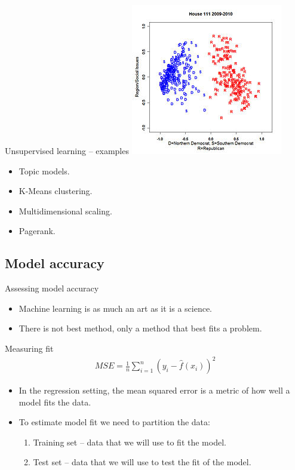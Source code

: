 \documentclass{beamer}
\begin{document}
\begin{frame}{Unsupervised learning -- examples } %
\centering
\includegraphics[scale=.5]{nominate}
	\begin{itemize}
		\item Topic models.
		\item K-Means clustering.
		\item Multidimensional scaling.
		\item Pagerank.
	\end{itemize}
\end{frame}

\subsection*{Model accuracy}

\begin{frame}{Assessing model accuracy } %
	\begin{itemize}
		\item Machine learning is as much an art as it is a science.
		\item There is not best method, only a method that best fits a problem.
	\end{itemize}
\end{frame}

\begin{frame}{Measuring fit } %
\begin{align*}
	MSE = \frac{1}{n} \sum_{i = 1}^{n} (y_{i} - \hat{f} (x_{i}) )^{2}
\end{align*} 
	\begin{itemize}
		\item In the regression setting, the mean squared error is a metric of how well a model fits the data. 
		\item To estimate model fit we need to partition the data:
			\begin{enumerate}
				\item Training set -- data that we will use to fit the model.
				\item Test set -- data that we will use to test the fit of the model.
			\end{enumerate}
	\end{itemize}
\end{frame}
\end{document}
